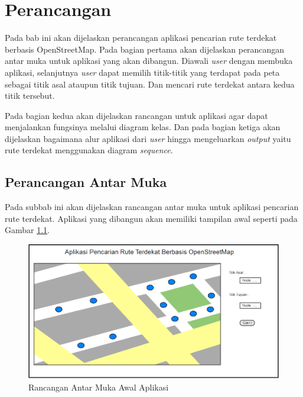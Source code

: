 \chapter{Perancangan}
Pada bab ini akan dijelaskan perancangan aplikasi pencarian rute terdekat
berbasis OpenStreetMap. Pada bagian pertama akan dijelaskan perancangan antar
muka untuk aplikasi yang akan dibangun. Diawali \textit{user} dengan membuka
aplikasi, selanjutnya \textit{user} dapat memilih titik-titik yang terdapat pada
peta sebagai titik asal ataupun titik tujuan. Dan mencari rute terdekat antara kedua titik
tersebut.

Pada bagian kedua akan dijelaskan rancangan untuk aplikasi agar dapat
menjalankan fungsinya melalui diagram kelas.
Dan pada bagian ketiga akan dijelaskan bagaimana alur aplikasi dari
\textit{user} hingga mengeluarkan \textit{output} yaitu rute terdekat
menggunakan diagram \textit{sequence}.

\section{Perancangan Antar Muka}
Pada subbab ini akan dijelaskan rancangan antar muka untuk aplikasi pencarian
rute terdekat. Aplikasi yang dibangun akan memiliki tampilan awal seperti pada
Gambar \ref{fig:mockup_1}.
\begin{figure}[h]
\centering
\includegraphics[scale=0.6]{Gambar/mockup_1}
\caption[Rancangan Antar Muka Awal Aplikasi]{Rancangan Antar Muka Awal Aplikasi}
\label{fig:mockup_1}
\end{figure}


